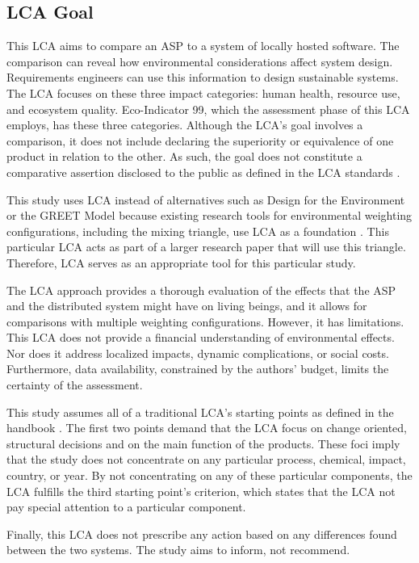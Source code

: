 \documentclass[final,journal,10pt,letterpaper,oneside,twocolumn,compsoc]%
{IEEEtran}
\begin{document}
\subsection{LCA Goal}
This LCA aims to compare an ASP to a system of
locally hosted software. The comparison can reveal how environmental
considerations affect system design. Requirements engineers can use this
information to design sustainable systems. The LCA focuses
on these three impact categories: human health, resource use, and ecosystem
quality. Eco-Indicator 99, which the assessment phase of this LCA  employs,
has these three categories. Although the LCA's goal involves a comparison, it
does not include declaring the superiority or equivalence of one product in
relation to the other. As such, the goal
does not constitute a comparative assertion disclosed to the public as defined
in the LCA standards \cite{lca}.

This study uses LCA instead of alternatives such as Design for the Environment
or the GREET Model because existing research tools
for environmental weighting configurations, including the mixing triangle, use
LCA
as a foundation \cite{triangle}. This particular LCA acts as part of a larger
research paper that will use this triangle.
Therefore, LCA serves as an appropriate tool for this particular study.

The LCA approach provides a
thorough evaluation of the effects that the ASP and the distributed system might
have on living beings, and it allows for comparisons with multiple weighting
configurations. However, it has limitations. This LCA does not provide a
financial understanding
of environmental effects. Nor does it address localized impacts, dynamic
complications, or social costs. Furthermore, data availability, constrained by
the authors' budget, limits the certainty of the assessment. 

This study assumes all of a traditional LCA's starting points as defined in the
handbook \cite{lca}. The first two points demand that the LCA
focus on change oriented, structural decisions and on the main
function of the
products. These foci imply that the study does not concentrate on any particular
process, chemical, impact, country, or year. By not concentrating on any of
these
particular components, the LCA fulfills the third starting point's criterion,
which states that the LCA not pay special attention to a particular component.

Finally, this LCA does not prescribe any action based on any differences found
between the two systems. The study aims to inform, not recommend.
\end{document}
